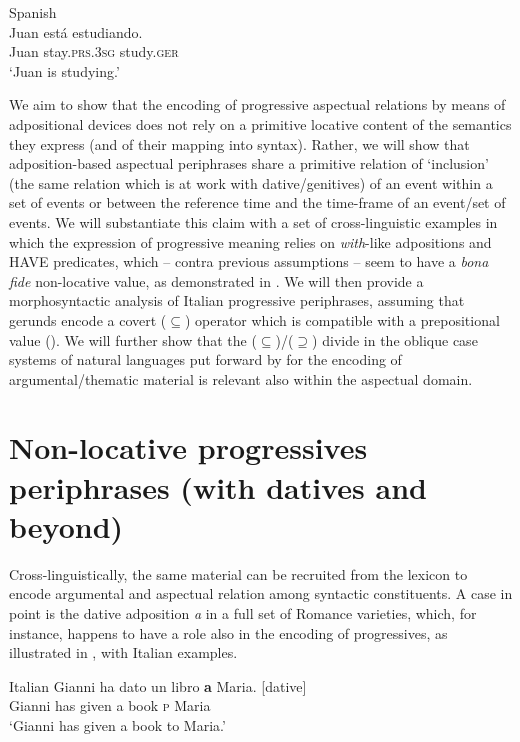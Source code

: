 \documentclass[output=paper,modfonts,nonflat,newtxmath,colorlinks,citecolor=brown]{langsci/langscibook}
\begin{document}
     \ex Spanish\\\label{ex:franco:9b}
    \gll  Juan está estudiando.\\
        Juan stay.\textsc{prs.3sg} study.\textsc{ger}\\
    \glt `Juan is studying.'
    \z
    \z

We aim to show that the encoding of progressive aspectual relations by means of adpositional devices does not rely on a primitive locative content of the semantics they express (and of their mapping into syntax). Rather, we will show that adposition-based aspectual periphrases share a primitive relation of ‘inclusion’ (the same relation which is at work with dative/genitives) of an event within a set of events or between the reference time and the time-frame of an event/set of events. We will substantiate this claim with a set of cross-linguistic examples in which the expression of progressive meaning relies on \textit{with}{}-like adpositions and HAVE predicates, which -- contra previous assumptions \citep{Freeze1992, DenDikken1998} -- seem to have a \textit{bona fide} non-locative value, as demonstrated in \citet{Levinson2011}. We will then provide a morphosyntactic analysis of Italian progressive periphrases, assuming that gerunds encode a covert (${\subseteq}$) operator which is compatible with a prepositional value (\citealt{Gallego2010, Franco2015}). We will further show that the (${\subseteq}$)/(${\supseteq}$) divide in the oblique case systems of natural languages put forward by \citet{FrancoManzini2017Ins} for the encoding of argumental/thematic material is relevant also within the aspectual domain.

\section{Non-locative progressives periphrases (with datives and beyond)}
\label{sec:franco:2}

Cross-linguistically, the same material can be recruited from the lexicon to encode argumental and aspectual relation among syntactic constituents. A case in point is the dative adposition \textit{a} in a full set of Romance varieties, which, for instance, happens to have a role also in the encoding of progressives, as illustrated in , with Italian examples.  

\ea%
    Italian\label{ex:franco:10}
    \ea \label{ex:franco:10a}
    \gll Gianni ha dato un libro \textbf{a} Maria. \hfill{[dative]}\\
        Gianni has given a book \textsc{p} Maria\\
    \glt ‘Gianni has given a book to Maria.’
    
\end{document}
